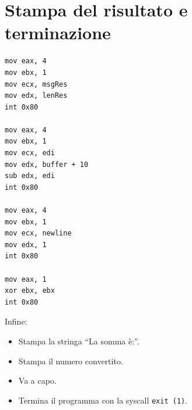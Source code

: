 \documentclass[a4paper,12pt]{article}
\begin{document}
	\newpage
	
	\section*{Stampa del risultato e terminazione}
	\begin{lstlisting}[language={[x86masm]Assembler}]
mov eax, 4
mov ebx, 1
mov ecx, msgRes
mov edx, lenRes
int 0x80

mov eax, 4
mov ebx, 1
mov ecx, edi
mov edx, buffer + 10
sub edx, edi
int 0x80

mov eax, 4
mov ebx, 1
mov ecx, newline
mov edx, 1
int 0x80

mov eax, 1
xor ebx, ebx
int 0x80
	\end{lstlisting}
	
	Infine:
	\begin{itemize}
		\item Stampa la stringa “La somma è:”.
		\item Stampa il numero convertito.
		\item Va a capo.
		\item Termina il programma con la syscall \texttt{exit (1)}. 
	\end{itemize}
	
\end{document}
